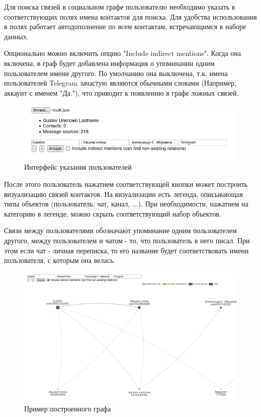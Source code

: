 Для поиска связей в социальном графе пользователю необходимо указать в соответствующих полях имена контактов для поиска. 
Для удобства использования в полях работает автодополнение по всем контактам, встречающимся в наборе данных.

Опционально можно включить опцию "Include indirect mentions". Когда она включена, в граф будет добавлена информация о упоминании одним пользователем имени другого.
По умолчанию она выключена, т.к. имена пользователей Telegram зачастую являются обычными словами (Например, аккаунт с именем "Да."), что приводит к появлению в графе ложных связей.

\begin{figure}[h!]
    \includegraphics[width=\linewidth]{ro/img/input.png}
    \caption{Интерфейс указания пользователей}
    \label{fig:input}
\end{figure}


После этого пользователь нажатием соответствующей кнопки может построить визуализацию связей контактов.
На визуализации есть легенда, описывающая типы объектов (пользователь, чат, канал, ...).
При необходимости, нажатием на категорию в легенде, можно скрыть соответствующий набор объектов.

Связи между пользователями обозначают упоминание одним пользователем другого, между пользователем и чатом - то, что пользователь в него писал.
При этом если чат - личная переписка, то его название будет соответствовать имени пользователя, с которым она велась.

\begin{figure}[h!]
    \includegraphics[width=\linewidth]{ro/img/graph.png}
    \caption{Пример построенного графа}
    \label{fig:graph}
\end{figure}